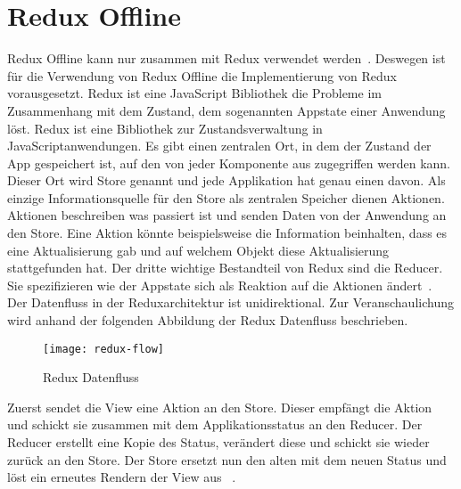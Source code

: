 \section{\label{sub:reduxoffline}Redux Offline}
Redux Offline kann nur zusammen mit Redux verwendet werden~\cite{redux-req}. Deswegen ist für die Verwendung von Redux Offline die Implementierung von Redux vorausgesetzt.
%
%
Redux ist eine JavaScript Bibliothek die Probleme im Zusammenhang mit dem Zustand, dem sogenannten \gls{App}state einer Anwendung löst.
Redux ist eine Bibliothek zur Zustandsverwaltung in JavaScriptanwendungen.
Es gibt einen zentralen Ort, in dem der Zustand der App gespeichert ist, auf den von jeder Komponente aus zugegriffen werden kann.
Dieser Ort wird Store genannt und jede Applikation hat genau einen davon. 
Als einzige Informationsquelle für den Store als zentralen Speicher dienen Aktionen. 
Aktionen beschreiben was passiert ist und senden Daten von der Anwendung an den Store.
Eine Aktion könnte beispielsweise die Information beinhalten, dass es eine Aktualisierung gab und auf welchem Objekt diese Aktualisierung stattgefunden hat.
Der dritte wichtige Bestandteil von Redux sind die Reducer. Sie spezifizieren wie der \gls{App}state sich als Reaktion auf die Aktionen ändert~\cite{redux}.\\
Der Datenfluss in der Reduxarchitektur ist unidirektional. Zur Veranschaulichung wird anhand der folgenden Abbildung der Redux Datenfluss beschrieben.
%
\begin{figure}[H]
  \centering
  \texttt{[image: redux-flow]}
  \grayRule
  \caption{Redux Datenfluss}
  \label{fig:rdx-dataflow}
\end{figure}
% 
Zuerst sendet die View eine Aktion an den Store. Dieser empfängt die Aktion und schickt sie zusammen mit dem Applikationsstatus an den Reducer.
Der Reducer erstellt eine Kopie des Status, verändert diese und schickt sie wieder zurück an den Store.
Der Store ersetzt nun den alten mit dem neuen Status und löst ein erneutes Rendern der View aus ~\cite{reduxflow}.
% 
